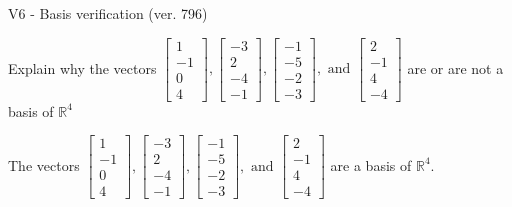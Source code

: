 \begin{exercise}
  \begin{exerciseTitle}V6 - Basis verification (ver. 796)\end{exerciseTitle}
  \begin{exerciseStatement}
    Explain why the vectors \(\left[\begin{array}{r}
1 \\
-1 \\
0 \\
4
\end{array}\right] , \left[\begin{array}{r}
-3 \\
2 \\
-4 \\
-1
\end{array}\right] , \left[\begin{array}{r}
-1 \\
-5 \\
-2 \\
-3
\end{array}\right] , \text{ and } \left[\begin{array}{r}
2 \\
-1 \\
4 \\
-4
\end{array}\right]\) are or are not a basis of \(\mathbb{R}^4\)	


  \end{exerciseStatement}
  \begin{exerciseAnswer}
   The vectors \(\left[\begin{array}{r}
1 \\
-1 \\
0 \\
4
\end{array}\right] , \left[\begin{array}{r}
-3 \\
2 \\
-4 \\
-1
\end{array}\right] , \left[\begin{array}{r}
-1 \\
-5 \\
-2 \\
-3
\end{array}\right] , \text{ and } \left[\begin{array}{r}
2 \\
-1 \\
4 \\
-4
\end{array}\right]\) 
  	 are  a basis of \(\mathbb{R}^4\).
  


  \end{exerciseAnswer}
\end{exercise}